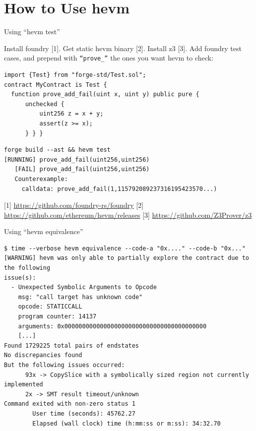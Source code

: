 \documentclass[aspectratio=169]{beamer}
\begin{document}
\section{How to Use hevm}

\begin{frame}[fragile=singleslide]{Using ``hevm test''}

Install foundry [1]. Get static hevm binary [2]. Install z3 [3]. Add foundry test cases, and prepend with \texttt{``prove\_''} the ones you want hevm to check:

\begin{Verbatim}[frame=single, framerule=0.2mm, framesep=2mm,fontsize=\footnotesize]
import {Test} from "forge-std/Test.sol";
contract MyContract is Test {
  function prove_add_fail(uint x, uint y) public pure {
      unchecked { 
          uint256 z = x + y;
          assert(z >= x);
      } } }
\end{Verbatim}

\begin{Verbatim}[frame=single, framerule=0.2mm, framesep=2mm,fontsize=\footnotesize]
forge build --ast && hevm test
[RUNNING] prove_add_fail(uint256,uint256)
   [FAIL] prove_add_fail(uint256,uint256)
   Counterexample:
     calldata: prove_add_fail(1,115792089237316195423570...)
\end{Verbatim}
\tiny [1] \url{https://github.com/foundry-rs/foundry} [2] \url{https://github.com/ethereum/hevm/releases} [3] \url{https://github.com/Z3Prover/z3}
\end{frame}

\begin{frame}[fragile=singleslide]{Using ``hevm equivalence''}
\begin{Verbatim}[frame=single, framerule=0.2mm, framesep=2mm,fontsize=\footnotesize]
$ time --verbose hevm equivalence --code-a "0x...." --code-b "0x..."
[WARNING] hevm was only able to partially explore the contract due to the following
issue(s):
  - Unexpected Symbolic Arguments to Opcode
    msg: "call target has unknown code"
    opcode: STATICCALL
    program counter: 14137
    arguments: 0x0000000000000000000000000000000000000000
    [...]
Found 1729225 total pairs of endstates
No discrepancies found
But the following issues occurred:
      93x -> CopySlice with a symbolically sized region not currently implemented
      2x -> SMT result timeout/unknown
Command exited with non-zero status 1
        User time (seconds): 45762.27
        Elapsed (wall clock) time (h:mm:ss or m:ss): 34:32.70
\end{Verbatim}
\end{frame}
\end{document}
